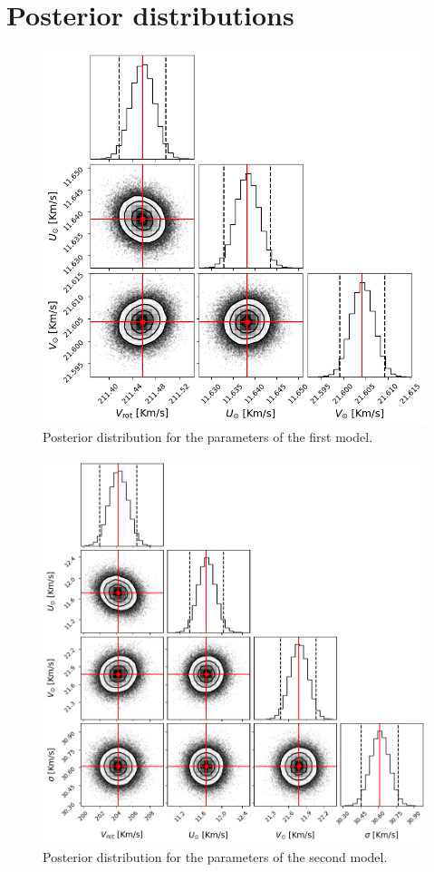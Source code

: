\newpage
\appendix

\section{Posterior distributions}\label{Appendix:PosteriorDistributions}

\begin{figure}[h]
    \centering
    \includegraphics[width = 0.8\linewidth]{Fig/PosteriorSimple.png}
    \caption{Posterior distribution for the parameters of the first model.}\label{fig:PosteriorSimple}
\end{figure}

\begin{figure}[h]
    \centering
    \includegraphics[width = 0.8\linewidth]{Fig/PosteriorFull.png}
    \caption{Posterior distribution for the parameters of the second model.}\label{fig:PosteriorFull}
\end{figure}